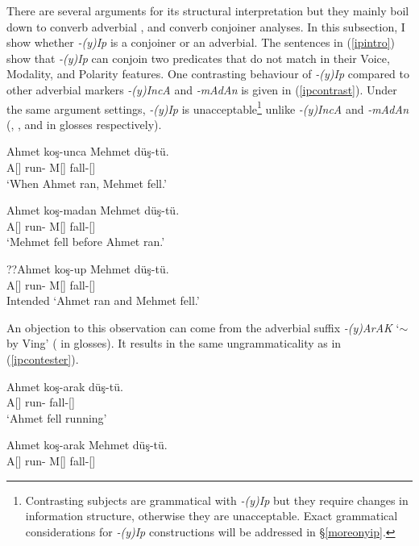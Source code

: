There are several arguments for its structural interpretation but they mainly boil down to converb adverbial \citep{demir2014adverbial, underhill1976turkish, goksel2004turkish}, and converb conjoiner \citep{fokkens2009inflectional, johanson1995turkic, kornfilt1997turkish} analyses. In this subsection, I show whether \textit{-(y)Ip} is a conjoiner or an adverbial. The sentences in (\ref{ipintro}) show that \textit{-(y)Ip} can conjoin two predicates that do not match in their Voice, Modality, and Polarity features. One contrasting behaviour of \textit{-(y)Ip} compared to other adverbial markers \textit{-(y)IncA} and \textit{-mAdAn} is given in (\ref{ipcontrast}). Under the same argument settings, \textit{-(y)Ip} is unacceptable\footnote{Contrasting subjects are grammatical with \textit{-(y)Ip} but they require changes in information structure, otherwise they are unacceptable. Exact grammatical considerations for \textit{-(y)Ip} constructions will be addressed in \S\ref{moreonyip}.} unlike \textit{-(y)IncA} and \textit{-mAdAn} ({\Pc}, {\When}, and {\Wo} in glosses respectively).

\begin{exe}
    \ex \label{ipcontrast}
    \begin{xlist}
        \ex \gll Ahmet koş-unca Mehmet düş-tü. \\ 
        A[{\Nom}] run-{\When} M[{\Nom}] fall-{\Pst}[{\Tsg}] \\
        \glt `When Ahmet ran, Mehmet fell.'
        
        \ex \gll Ahmet koş-madan Mehmet düş-tü. \\
        A[{\Nom}] run-{\Wo} M[{\Nom}] fall-{\Pst}[{\Tsg}] \\
        \glt `Mehmet fell before Ahmet ran.'
        
        \ex \gll ??Ahmet koş-up Mehmet düş-tü. \\ 
        A[{\Nom}] run-{\Pc} M[{\Nom}] fall-{\Pst}[{\Tsg}] \\
        \glt Intended `Ahmet ran and Mehmet fell.'
    \end{xlist}
\end{exe}

An objection to this observation can come from the adverbial suffix \textit{-(y)ArAK} `$\sim$ by Ving' ({\By} in glosses). It results in the same ungrammaticality as in (\ref{ipcontester}).

\begin{exe}
    \ex \label{ipcontester}
    \begin{xlist}
    \ex \gll Ahmet koş-arak düş-tü. \\
    A[{\Nom}] run-{\By} fall-{\Pst}[{\Tsg}] \\
    \glt `Ahmet fell running'
    
    \ex \gll *Ahmet koş-arak Mehmet düş-tü. \\ 
    A[{\Nom}] run-{\By} M[{\Nom}] fall-{\Pst}[{\Tsg}] \\
    \end{xlist}
\end{exe}

